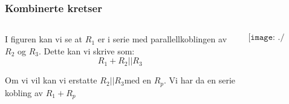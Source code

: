 \documentclass[aspectratio=169,xcolor=dvipsnames]{beamer}
\begin{document}
\begin{frame} \frametitle{Kombinerte kretser}
	\begin{columns}
		\begin{column}{0.5\textwidth}
			

I figuren kan vi se at $R_{1}$
er i serie med parallellkoblingen av $R_{2}$ og $R_{3}$. Dette kan
vi skrive som:
\[
R_{1}+R_{2}||R_{3}
\]

Om vi vil kan vi erstatte $R_{2}||R_{3}$med en $R_{p}$. Vi har da
en serie kobling av $R_{1}+R_{p}$ 
		\end{column}
		\begin{column}{0.5\textwidth}
			$$\texttt{[image: ./kombieks1.pdf]}$$
		\end{column}
	\end{columns}
\end{frame}
\end{document}
